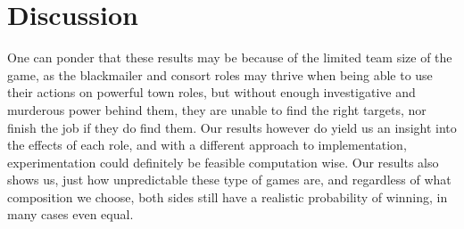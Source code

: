 \section{Discussion}\label{sec:discussion}
One can ponder that these results may be because of the 
limited team size of
the game, as the blackmailer and consort roles may 
thrive when being able to
use
their actions on powerful town roles, but without 
enough investigative and
murderous power behind them, they are unable to find 
the right targets, nor
finish the job if they do find them. Our results however do yield us 
an insight into the effects of each role, and with a different approach to implementation, 
experimentation could definitely be feasible computation wise. Our results also shows us, 
just how unpredictable these type of games are, and regardless of what composition we choose,
both sides still have a realistic probability of winning, in many cases even equal.